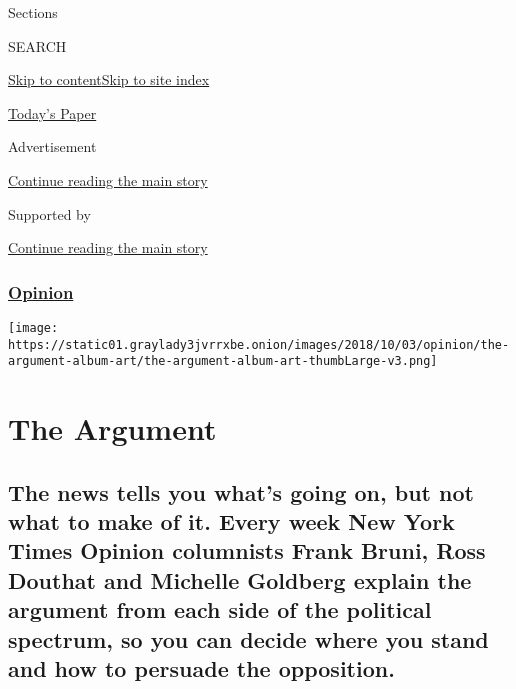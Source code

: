 Sections

SEARCH

\protect\hyperlink{site-content}{Skip to
content}\protect\hyperlink{site-index}{Skip to site index}

\href{https://myaccount.nytimes3xbfgragh.onion/auth/login?response_type=cookie\&client_id=vi}{}

\href{https://www.nytimes3xbfgragh.onion/section/todayspaper}{Today's
Paper}

Advertisement

\protect\hyperlink{after-top}{Continue reading the main story}

Supported by

\protect\hyperlink{after-sponsor}{Continue reading the main story}

\hypertarget{opinion}{%
\subsubsection{\texorpdfstring{\href{/section/opinion}{Opinion}}{Opinion}}\label{opinion}}

\texttt{[image: https://static01.graylady3jvrrxbe.onion/images/2018/10/03/opinion/the-argument-album-art/the-argument-album-art-thumbLarge-v3.png]}

\hypertarget{the-argument}{%
\section{The Argument}\label{the-argument}}

\hypertarget{the-news-tells-you-whats-going-on-but-not-what-to-make-of-it-every-week-new-york-times-opinion-columnists-frank-bruni-ross-douthat-and-michelle-goldberg-explain-the-argument-from-each-side-of-the-political-spectrum-so-you-can-decide-where-you-stand-and-how-to-persuade-the-opposition}{%
\subsection{The news tells you what's going on, but not what to make of
it. Every week New York Times Opinion columnists Frank Bruni, Ross
Douthat and Michelle Goldberg explain the argument from each side of the
political spectrum, so you can decide where you stand and how to
persuade the
opposition.}\label{the-news-tells-you-whats-going-on-but-not-what-to-make-of-it-every-week-new-york-times-opinion-columnists-frank-bruni-ross-douthat-and-michelle-goldberg-explain-the-argument-from-each-side-of-the-political-spectrum-so-you-can-decide-where-you-stand-and-how-to-persuade-the-opposition}}

